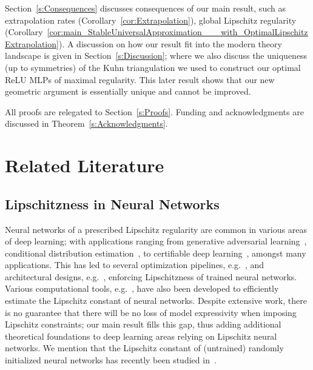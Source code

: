 \documentclass{article}
\numberwithin{equation}{section}
\theoremstyle{definition}
\begin{document}
Section~\ref{s:Consequences} discusses consequences of our main result, such as extrapolation rates (Corollary~\ref{cor:Extrapolation}), global Lipschitz regularity (Corollary~\ref{cor:main_StableUniversalApproximation___with_OptimalLipschitzExtrapolation}).  A discussion on how our result fit into the modern theory landscape is given in Section~\ref{s:Discussion}; where we also discuss the uniqueness (up to symmetries) of the Kuhn triangulation we used to construct our optimal ReLU MLPs of maximal regularity.  This later result shows that our new geometric argument is essentially unique and cannot be improved.

All proofs are relegated to Section~\ref{s:Proofs}.  Funding and acknowledgments are discussed in Theorem~\ref{s:Acknowledgments}.


\section{Related Literature}
\label{s:Related}

\subsection{Lipschitzness in Neural Networks}
\label{s:Related__ss:LipschitzNeuralNetworks}

Neural networks of a prescribed Lipschitz regularity are common in various areas of deep learning; with applications ranging from generative adversarial learning~\cite{arjovsky2017wasserstein,cao2019multi,korotinneural}, conditional distribution estimation~\cite{benezet2024learning}, to certifiable deep learning~\cite{fazlyab2024certified}, amongst many applications.  This has led to several optimization pipelines, e.g.~\cite{neyshabur2015pathSGD_NIPS,tsuzuku2018lipschitz,qu2023data,gouk2021regularisation,pauli2021training}, and architectural designs, e.g.~\cite{li2019orthogonal,lezcano2019cheap,araujo2023a}, enforcing Lipschitzness of trained neural networks.  Various computational tools, e.g.~\cite{jordan2020exactly,bhowmick2021lipbab,xue2022chordal}, have also been developed to efficiently estimate the Lipschitz constant of neural networks.  Despite extensive work, there is no guarantee that there will be no loss of model expressivity when imposing Lipschitz constraints; our main result fills this gap, thus adding additional theoretical foundations to deep learning areas relying on Lipschitz neural networks.  We mention that the Lipschitz constant of (untrained) randomly initialized neural networks has recently been studied in~\cite{geuchen2023upper}.
\end{document}
